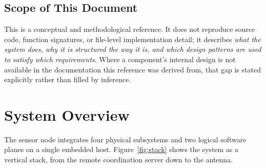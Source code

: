 \documentclass[11pt,a4paper]{article}
\begin{document}
\subsection{Scope of This Document}

This is a conceptual and methodological reference. It does not reproduce source code,
function signatures, or file-level implementation detail; it describes \emph{what the system
does, why it is structured the way it is, and which design patterns are used to satisfy which
requirements}. Where a component's internal design is not available in the documentation
this reference was derived from, that gap is stated explicitly rather than filled by
inference.

\section{System Overview}

The sensor node integrates four physical subsystems and two logical software planes on a
single embedded host. Figure~\ref{fig:stack} shows the system as a vertical stack, from the
remote coordination server down to the antenna.
\end{document}
